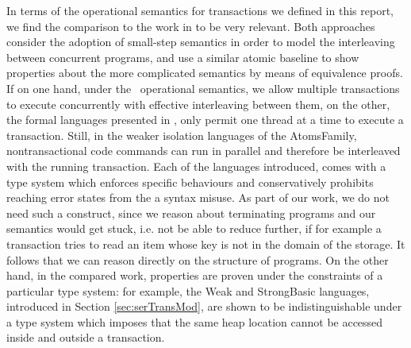 	In terms of the operational semantics for transactions we defined in this report, we find the comparison to the work in \cite{semanticsTransactions} to be very relevant. Both approaches consider the adoption of small-step semantics in order to model the interleaving between concurrent programs, and use a similar atomic baseline to show properties about the more complicated semantics by means of equivalence proofs. If on one hand, under the \tpl\ operational semantics, we allow multiple transactions to execute concurrently with effective interleaving between them, on the other, the formal languages presented in \cite{semanticsTransactions}, only permit one thread at a time to execute a transaction. Still, in the weaker isolation languages of the \textsf{AtomsFamily}, nontransactional code commands can run in parallel and therefore be interleaved with the running transaction. Each of the languages introduced, comes with a type system which enforces specific behaviours and conservatively prohibits reaching error states from the a syntax misuse. As part of our work, we do not need such a construct, since we reason about terminating programs and our semantics would get stuck, i.e. not be able to reduce further, if for example a transaction tries to read an item whose key is not in the domain of the storage. It follows that we can reason directly on the structure of programs. On the other hand, in the compared work, properties are proven under the constraints of a particular type system: for example, the \textsf{Weak} and \textsf{StrongBasic} languages, introduced in Section \ref{sec:serTransMod}, are shown to be indistinguishable under a type system which imposes that the same heap location cannot be accessed inside and outside a transaction.